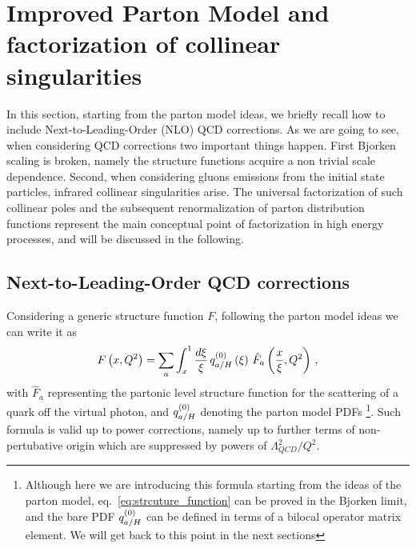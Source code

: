 \section{Improved Parton Model and factorization of collinear singularities}
In this section, starting from the parton model ideas, we briefly recall how to include Next-to-Leading-Order
(NLO) QCD corrections.
As we are going to see, when considering QCD corrections two important things happen.
First Bjorken scaling is broken, namely the structure functions acquire a non trivial scale dependence.
Second, when considering gluons emissions from the initial state particles, infrared collinear singularities
arise. The universal factorization of such collinear poles and the subsequent renormalization of parton distribution functions
represent the main conceptual point of factorization in high energy processes, and 
will be discussed in the following.  

%
\subsection{Next-to-Leading-Order QCD corrections}
\label{sec:QCD_corrections}
Considering a generic structure function $F$, following the parton model ideas we can write it as
\begin{align}
    \label{eq:strcuture_function}
    F\left(x,Q^2\right) = \sum_a \int_x^1 \frac{d\xi}{\xi}\, q^{{(0)}}_{a/H}\left(\xi\right)\, \hat{F}_a\left(\frac{x}{\xi},Q^2\right)\,,
\end{align}
with $\hat{F}_a$ representing the partonic level structure function for the scattering of a
quark off the virtual photon, and $q^{{(0)}}_{a/H}$ denoting the parton model PDFs
\footnote{Although here we are introducing this formula starting from the ideas of the parton model, 
eq.~\eqref{eq:strcuture_function} can be proved in the Bjorken limit, and the bare PDF $q^{{(0)}}_{a/H}$ can be
defined in terms of a bilocal operator matrix element. We will get back to this point in the next sections}. 
Such formula is valid up to power corrections, namely up to further terms of non-pertubative origin which are suppressed by powers
of $\Lambda_{QCD}^2/Q^2$.

